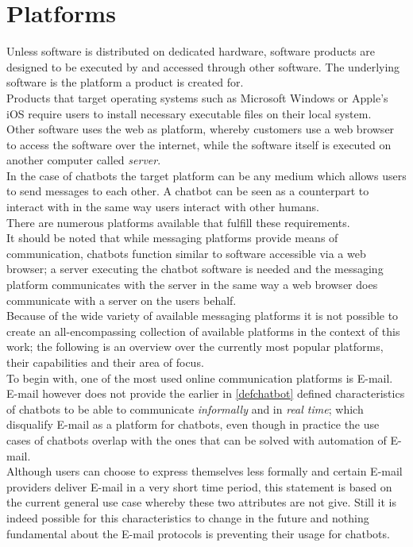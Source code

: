 \section{Platforms}


Unless software is distributed on dedicated hardware, software products are designed to be executed by and accessed through other software. The underlying software is the platform a product is created for.
\\
Products that target operating systems such as Microsoft Windows or Apple's iOS require users to install necessary executable files on their local system.
\\
Other software uses the web as platform, whereby customers use a web browser to access the software over the internet, while the software itself is executed on another computer called \emph{server}.
\\

In the case of chatbots the target platform can be any medium which allows users to send messages to each other. A chatbot can be seen as a counterpart to interact with in the same way users interact with other humans.
\\

There are numerous platforms available that fulfill these requirements.
\\

It should be noted that while messaging platforms provide means of communication, chatbots function similar to software accessible via a web browser; a server executing the chatbot software is needed and the messaging platform communicates with the server in the same way a web browser does communicate with a server on the users behalf.
\\

Because of the wide variety of available messaging platforms it is not possible to create an all-encompassing collection of available platforms in the context of this work; the following is an overview over the currently most popular platforms, their capabilities and their area of focus.
\\

To begin with, one of the most used online communication platforms is E-mail.
\\
E-mail however does not provide the earlier in \ref{defchatbot} defined characteristics of chatbots to be able to communicate \emph{informally} and in \emph{real time}; which disqualify E-mail as a platform for chatbots, even though in practice the use cases of chatbots overlap with the ones that can be solved with automation of E-mail.
\\
Although users can choose to express themselves less formally and certain E-mail providers deliver E-mail in a very short time period,
this statement is based on the current general use case whereby these two attributes are not give.
Still it is indeed possible for this characteristics to change in the future
and nothing fundamental about the E-mail protocols is preventing their usage for chatbots.
\\

